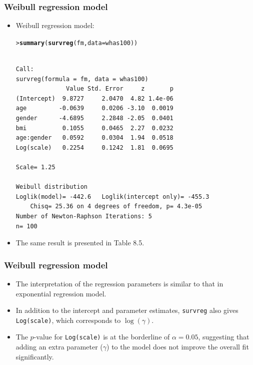 \documentclass[10pt]{beamer}\usepackage[]{graphicx}\usepackage[]{color}
\makeatletter
\newcommand{\hlstd}[1]{\textcolor[rgb]{0.345,0.345,0.345}{#1}}%
\newcommand{\hlkwc}[1]{\textcolor[rgb]{0.333,0.667,0.333}{#1}}%
\newcommand{\hlkwd}[1]{\textcolor[rgb]{0.737,0.353,0.396}{\textbf{#1}}}%
\newenvironment{kframe}{%
 \def\at@end@of@kframe{}%
 \ifinner\ifhmode%
  \def\at@end@of@kframe{\end{minipage}}%
  \begin{minipage}{\columnwidth}%
 \fi\fi%
 \def\FrameCommand##1{\hskip\@totalleftmargin \hskip-\fboxsep
 \colorbox{shadecolor}{##1}\hskip-\fboxsep
     \hskip-\linewidth \hskip-\@totalleftmargin \hskip\columnwidth}%
 \MakeFramed {\advance\hsize-\width
   \@totalleftmargin\z@ \linewidth\hsize
   \@setminipage}}%
 {\par\unskip\endMakeFramed%
 \at@end@of@kframe}
\newenvironment{knitrout}{}{} %
\renewenvironment{knitrout}{\setlength{\topsep}{-.2mm}}{}
\newcommand{\code}[1]{{\texttt{#1}}}
\makeatother
\begin{document}
\begin{frame}[fragile]
  \frametitle{Weibull regression model}
  \begin{itemize}
  \item Weibull regression model:
\begin{knitrout}\scriptsize
{}\color{fgcolor}\begin{kframe}
\begin{alltt}
\hlstd{> }\hlkwd{summary}\hlstd{(}\hlkwd{survreg}\hlstd{(fm,} \hlkwc{data} \hlstd{= whas100))}
\end{alltt}
\begin{verbatim}

Call:
survreg(formula = fm, data = whas100)
              Value Std. Error     z       p
(Intercept)  9.8727     2.0470  4.82 1.4e-06
age         -0.0639     0.0206 -3.10  0.0019
gender      -4.6895     2.2848 -2.05  0.0401
bmi          0.1055     0.0465  2.27  0.0232
age:gender   0.0592     0.0304  1.94  0.0518
Log(scale)   0.2254     0.1242  1.81  0.0695

Scale= 1.25 

Weibull distribution
Loglik(model)= -442.6   Loglik(intercept only)= -455.3
	Chisq= 25.36 on 4 degrees of freedom, p= 4.3e-05 
Number of Newton-Raphson Iterations: 5 
n= 100 
\end{verbatim}
\end{kframe}
\end{knitrout}
\item The same result is presented in Table 8.5.
\end{itemize}
\end{frame}


\begin{frame}
  \frametitle{Weibull regression model}
  \begin{itemize}
  \item The interpretation of the regression parameters is similar to that in exponential regression model.
  \item In addition to the intercept and parameter estimates, \code{survreg} also gives \code{Log(scale)}, which corresponds to $\log(\gamma)$.
  \item The $p$-value for \code{Log(scale)} is at the borderline of $\alpha = 0.05$,
    suggesting that adding an extra parameter ($\gamma$) to the model does not improve the overall fit significantly.
  \end{itemize}
\end{frame}
\end{document}
